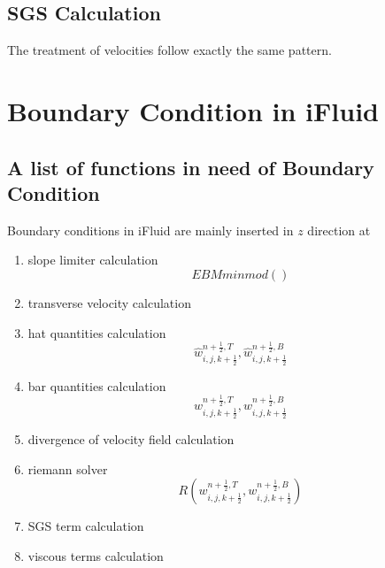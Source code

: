 \documentclass{article}
\numberwithin{equation}{subsection}
\begin{document}
\subsection{SGS Calculation}
The treatment of velocities follow exactly the same pattern.


\goodbreak
\newpage




\section{Boundary Condition in iFluid}




\subsection{A list of functions in need of Boundary Condition}

Boundary conditions in iFluid are mainly inserted in $z$ direction at
\begin{enumerate}

\item slope limiter calculation
\begin{equation}
    EBMminmod()
\end{equation}

\item transverse velocity calculation

\item hat quantities calculation
\begin{equation}
\widehat{w}^{n+\frac{1}{2},T}_{i,j,k+\frac{1}{2}} , \widehat{w}^{n+\frac{1}{2},B}_{i,j,k+\frac{1}{2}}
\end{equation}

\item bar quantities calculation
\begin{equation}
    {w}^{n+\frac{1}{2},T}_{i,j,k+\frac{1}{2}} , {w}^{n+\frac{1}{2},B}_{i,j,k+\frac{1}{2}}
\end{equation}

\item divergence of velocity field calculation

\item riemann solver
\begin{equation}
R({w}^{n+\frac{1}{2},T}_{i,j,k+\frac{1}{2}}, {w}^{n+\frac{1}{2},B}_{i,j,k+\frac{1}{2}})
\end{equation}

\item SGS term calculation

\item viscous terms calculation


\end{enumerate}
\end{document}
